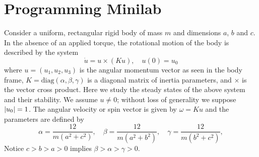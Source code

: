 \documentclass[12pt]{article}
\begin{document}
\section{Programming Minilab}
Consider a uniform, rectangular rigid body of mass $m$ and dimensions $a$, $b$ and $c$. In
the absence of an applied torque, the rotational motion of the body is described by
the system
\begin{equation}
  \label{eq:minilab-problem}
  \dot{u}=u\times(Ku),\quad u(0)=u_0
\end{equation}
where $u = (u_1, u_2, u_3)$ is the angular momentum vector as seen in the body
frame, $K = \text{diag}(\alpha, \beta, \gamma)$ is a diagonal matrix of inertia
parameters, and $\times$ is the vector cross product. Here we study the steady
states of the above system and their stability. We assume $u \ne 0$; without
loss of generality we suppose $\left|{u_0}\right|=1$. The angular velocity or spin vector
is given by $\omega = Ku$ and the parameters are defined by
\begin{equation*}
  \alpha = \frac{12}{m(a^2+c^2)},\quad\beta = \frac{12}{m(a^2+b^2)},\quad \gamma = \frac{12}{m(b^2+c^2)},
\end{equation*}
Notice $c>b>a>0$ implies $\beta>\alpha>\gamma>0$.
\end{document}
